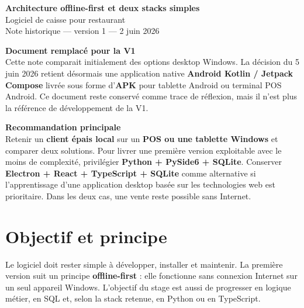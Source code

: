 \documentclass[11pt,a4paper]{article}
\begin{document}
\begin{center}
  {\fontsize{22}{26}\selectfont\bfseries\color{primary}
  Architecture offline-first et deux stacks simples}\\[3pt]
  {\large Logiciel de caisse pour restaurant}\\[7pt]
  {\small\color{textgray}Note historique --- version 1 --- 2 juin 2026}
\end{center}

\begin{tcolorbox}[
  colback=softyellow,
  colframe=warning,
  boxrule=0.8pt,
  arc=2pt,
  left=8pt,right=8pt,top=7pt,bottom=7pt
]
\textbf{\color{warning}Document remplacé pour la V1}\\
Cette note comparait initialement des options desktop Windows. La décision du 5 juin 2026 retient
désormais une application native \textbf{Android Kotlin / Jetpack Compose} livrée sous forme
d'\textbf{APK} pour tablette Android ou terminal POS Android. Ce document reste conservé comme
trace de réflexion, mais il n'est plus la référence de développement de la V1.
\end{tcolorbox}

\begin{tcolorbox}[
  colback=softgreen,
  colframe=primary,
  boxrule=0.8pt,
  arc=2pt,
  left=8pt,right=8pt,top=7pt,bottom=7pt
]
\textbf{\color{primary}Recommandation principale}\\
Retenir un \textbf{client épais local} sur un \textbf{POS ou une tablette Windows} et comparer
deux solutions.
Pour livrer une première version exploitable avec le moins de complexité, privilégier
\textbf{Python + PySide6 + SQLite}. Conserver \textbf{Electron + React + TypeScript + SQLite}
comme alternative si l'apprentissage d'une application desktop basée sur les technologies web
est prioritaire. Dans les deux cas, une vente reste possible sans Internet.
\end{tcolorbox}

\section{Objectif et principe}

Le logiciel doit rester simple à développer, installer et maintenir. La première version suit un
principe \textbf{offline-first} : elle fonctionne sans connexion Internet sur un seul appareil
Windows. L'objectif du stage est aussi de progresser en logique métier, en SQL et, selon la stack
retenue, en Python ou en TypeScript.
\end{document}
